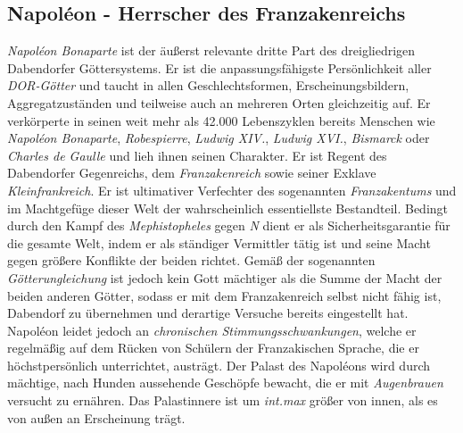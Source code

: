 \subsection{{Napoléon - Herrscher des Franzakenreichs}}
\textit{Napoléon Bonaparte} ist der äußerst relevante dritte Part des dreigliedrigen Dabendorfer Göttersystems. Er ist die anpassungsfähigste Persönlichkeit aller \textit{DOR-Götter} und taucht in allen Geschlechtsformen, Erscheinungsbildern, Aggregatzuständen und teilweise auch an mehreren Orten gleichzeitig auf. Er verkörperte in seinen weit mehr als 42.000 Lebenszyklen bereits Menschen wie \textit{Napoléon Bonaparte}, \textit{Robespierre}, \textit{Ludwig XIV.}, \textit{Ludwig XVI.}, \textit{Bismarck} oder \textit{Charles de Gaulle} und lieh ihnen seinen Charakter. Er ist Regent des Dabendorfer Gegenreichs, dem \textit{Franzakenreich} sowie seiner Exklave \textit{Kleinfrankreich}. Er ist ultimativer Verfechter des sogenannten \textit{Franzakentums} und im Machtgefüge dieser Welt der wahrscheinlich essentiellste Bestandteil. Bedingt durch den Kampf des \textit{Mephistopheles} gegen \textit{N} dient er als Sicherheitsgarantie für die gesamte Welt, indem er als ständiger Vermittler tätig ist und seine Macht gegen größere Konflikte der beiden richtet. Gemäß der sogenannten \textit{Götterungleichung} ist jedoch kein Gott mächtiger als die Summe der Macht der beiden anderen Götter, sodass er mit dem Franzakenreich selbst nicht fähig ist, Dabendorf zu übernehmen und derartige Versuche bereits eingestellt hat. Napoléon leidet jedoch an \textit{chronischen Stimmungsschwankungen}, welche er regelmäßig auf dem Rücken von Schülern der Franzakischen Sprache, die er höchstpersönlich unterrichtet, austrägt. Der Palast des Napoléons wird durch mächtige, nach Hunden aussehende Geschöpfe bewacht, die er mit \textit{Augenbrauen} versucht zu ernähren. Das Palastinnere ist um \textit{int.max} größer von innen, als es von außen an Erscheinung trägt.

